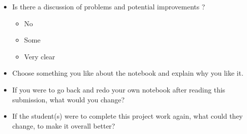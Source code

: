 \documentclass[a4paper,11pt]{article}
\begin{document}
\begin{itemize}
\item Is there a discussion of problems and potential improvements ?
  \begin{itemize}
  \item No
  \item Some
  \item Very clear
  \end{itemize}

\item Choose something you like about the notebook and explain why you like it. 

\item If you were to go back and redo your own notebook after reading this submission, what would you change?

\item If the student(s) were to complete this project work again, what could they change, to make it overall better?
\end{itemize}
\end{document}
